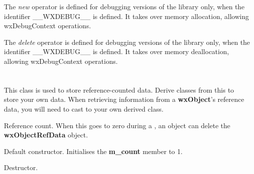 \label{wxobjectnew}


The {\it new} operator is defined for debugging versions of the library only, when
the identifier \_\_WXDEBUG\_\_ is defined. It takes over memory allocation, allowing
wxDebugContext operations.

\label{wxobjectdelete}


The {\it delete} operator is defined for debugging versions of the library only, when
the identifier \_\_WXDEBUG\_\_ is defined. It takes over memory deallocation, allowing
wxDebugContext operations.

\section{}\label{wxobjectrefdata}

This class is used to store reference-counted data. Derive classes from this to
store your own data. When retrieving information from a {\bf wxObject}'s reference data,
you will need to cast to your own derived class.






\label{wxobjectrefdatamcount}


Reference count. When this goes to zero during a , an object
can delete the {\bf wxObjectRefData} object.

\label{wxobjectrefdatactor}


Default constructor. Initialises the {\bf m\_count} member to 1.

\label{wxobjectrefdatadtor}


Destructor.


